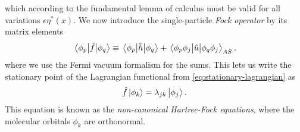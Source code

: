             which according to the fundamental lemma of calculus
            \cite{wiki:fundamental-lemma} must be valid for all variations
            $\epsilon\eta^{*}(x)$.
            We now introduce the single-particle \emph{Fock operator} by
            its matrix elements
            \begin{align}
                \mel{\phi_p}{\hat{f}}{\phi_q}
                \equiv
                \mel{\phi_p}{\hat{h}}{\phi_q}
                +
                \mel{\phi_p\phi_j}{\hat{u}}{\phi_q\phi_j}_{AS},
                \label{eq:fock-mel}
            \end{align}
            where we use the Fermi vacuum formalism for the sums.
            This lets us write the stationary point of the Lagrangian functional
            from \autoref{eq:stationary-lagrangian} as
            \begin{align}
                \hat{f}\ket{\phi_k}
                = \lambda_{jk}\ket{\phi_j}.
                \label{eq:non-canonical-hartree-fock}
            \end{align}
            This equation is known as the \emph{non-canonical Hartree-Fock
            equations}, where the molecular orbitals $\phi_k$ are orthonormal.

